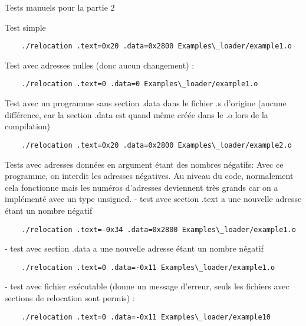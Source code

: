 \documentclass[a4paper]{article} %
\begin{document}
\noindent Tests manuels pour la partie 2

\noindent Test simple
\begin{lstlisting}
    ./relocation .text=0x20 .data=0x2800 Examples\_loader/example1.o
\end{lstlisting}
\bigbreak

\noindent Test avec adresses nulles (donc aucun changement) :
\begin{lstlisting}
    ./relocation .text=0 .data=0 Examples\_loader/example1.o
\end{lstlisting}
\bigbreak

\noindent Test avec un programme sans section .data dans le fichier .s d'origine 
(aucune différence, car la section .data est quand même créée dans le .o lors 
de la compilation)
\begin{lstlisting}
    ./relocation .text=0x20 .data=0x2800 Examples\_loader/example2.o
\end{lstlisting}
\bigbreak

\noindent Tests avec adresses données en argument étant des nombres négatifs:
Avec ce programme, on interdit les adresses négatives. Au niveau du code, 
normalement cela fonctionne mais les numéros d'adresses deviennent très grands 
car on a implémenté avec un type unsigned.
\bigbreak
\noindent - test avec section .text a une nouvelle adresse étant un nombre négatif
\begin{lstlisting}
    ./relocation .text=-0x34 .data=0x2800 Examples\_loader/example1.o
\end{lstlisting}

\noindent - test avec section .data a une nouvelle adresse étant un nombre négatif
\begin{lstlisting}
    ./relocation .text=0 .data=-0x11 Examples\_loader/example1.o
\end{lstlisting}


\noindent - test avec fichier exécutable (donne un message d’erreur, seuls les fichiers 
avec sections de relocation sont permis) :
\begin{lstlisting}
    ./relocation .text=0 .data=-0x11 Examples\_loader/example10
\end{lstlisting}
\end{document}
